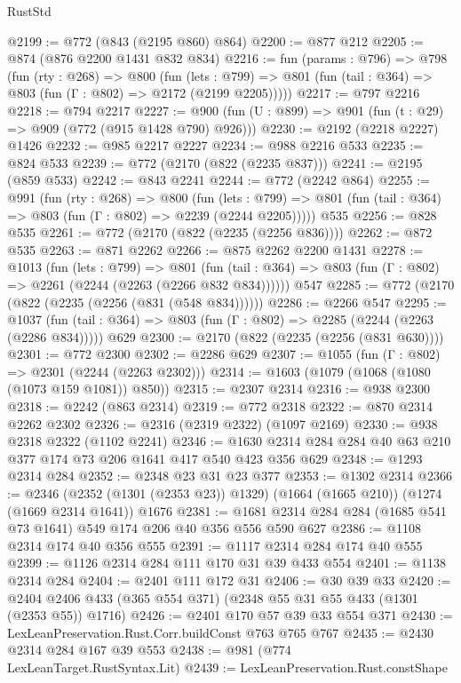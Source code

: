 \begin{lexlean}{RustStd}
\begin{coremodule}
@2199 := @772 (@843 (@2195 @860) @864)
@2200 := @877 @212
@2205 := @874 (@876 @2200 @1431 @832 @834)
@2216 := fun (params : @796) =>
  @798
    (fun (rty : @268) =>
    @800
      (fun (lets : @799) =>
      @801 (fun (tail : @364) => @803 (fun (Γ : @802) => @2172 (@2199 @2205)))))
@2217 := @797 @2216
@2218 := @794 @2217
@2227 := @900 (fun (U : @899) => @901 (fun (t : @29) => @909 (@772 (@915 @1428 @790) @926)))
@2230 := @2192 (@2218 @2227) @1426
@2232 := @985 @2217 @2227
@2234 := @988 @2216 @533
@2235 := @824 @533
@2239 := @772 (@2170 (@822 (@2235 @837)))
@2241 := @2195 (@859 @533)
@2242 := @843 @2241
@2244 := @772 (@2242 @864)
@2255 := @991
    (fun (rty : @268) =>
    @800
      (fun (lets : @799) =>
      @801 (fun (tail : @364) => @803 (fun (Γ : @802) => @2239 (@2244 @2205)))))
    @535
@2256 := @828 @535
@2261 := @772 (@2170 (@822 (@2235 (@2256 @836))))
@2262 := @872 @535
@2263 := @871 @2262
@2266 := @875 @2262 @2200 @1431
@2278 := @1013
    (fun (lets : @799) =>
    @801 (fun (tail : @364) => @803 (fun (Γ : @802) => @2261 (@2244 (@2263 (@2266 @832 @834))))))
    @547
@2285 := @772 (@2170 (@822 (@2235 (@2256 (@831 (@548 @834))))))
@2286 := @2266 @547
@2295 := @1037
    (fun (tail : @364) => @803 (fun (Γ : @802) => @2285 (@2244 (@2263 (@2286 @834)))))
    @629
@2300 := @2170 (@822 (@2235 (@2256 (@831 @630))))
@2301 := @772 @2300
@2302 := @2286 @629
@2307 := @1055 (fun (Γ : @802) => @2301 (@2244 (@2263 @2302)))
@2314 := @1603 (@1079 (@1068 (@1080 (@1073 @159 @1081)) @850))
@2315 := @2307 @2314
@2316 := @938 @2300
@2318 := @2242 (@863 @2314)
@2319 := @772 @2318
@2322 := @870 @2314 @2262 @2302
@2326 := @2316 (@2319 @2322) (@1097 @2169)
@2330 := @938 @2318 @2322 (@1102 @2241)
@2346 := @1630 @2314 @284 @284 @40 @63 @210 @377 @174 @73 @206 @1641 @417 @540 @423 @356 @629
@2348 := @1293 @2314 @284
@2352 := @2348 @23 @31 @23 @377
@2353 := @1302 @2314
@2366 := @2346
    (@2352 (@1301 (@2353 @23)) @1329)
    (@1664 (@1665 @210))
    (@1274 (@1669 @2314 @1641))
    @1676
@2381 := @1681 @2314 @284 @284 (@1685 @541 @73 @1641) @549 @174 @206 @40 @356 @556 @590 @627
@2386 := @1108 @2314 @174 @40 @356 @555
@2391 := @1117 @2314 @284 @174 @40 @555
@2399 := @1126 @2314 @284 @111 @170 @31 @39 @433 @554
@2401 := @1138 @2314 @284
@2404 := @2401 @111 @172 @31
@2406 := @30 @39 @33
@2420 := @2404 @2406 @433 (@365 @554 @371) (@2348 @55 @31 @55 @433 (@1301 (@2353 @55)) @1716)
@2426 := @2401 @170 @57 @39 @33 @554 @371
@2430 := LexLeanPreservation.Rust.Corr.buildConst @763 @765 @767
@2435 := @2430 @2314 @284 @167 @39 @553
@2438 := @981 (@774 LexLeanTarget.RustSyntax.Lit)
@2439 := LexLeanPreservation.Rust.constShape

\end{coremodule}
\end{lexlean}
